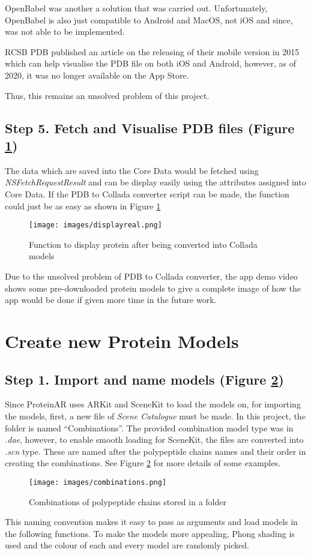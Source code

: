 OpenBabel was another a solution that was carried out. Unfortunately, OpenBabel is also just compatible to Android and MacOS, not iOS and since, was not able to be implemented. 

RCSB PDB published an article on the releasing of their mobile version in 2015 which can help visualise the PDB file on both iOS and Android, however, as of 2020, it was no longer available on the App Store.

Thus, this remains an unsolved problem of this project.

\subsection{Step 5. Fetch and Visualise PDB files (Figure \ref{fig:displayreal})}

The data which are saved into the Core Data would be fetched using \emph{NSFetchRequestResult} and can be display easily using the attributes assigned into Core Data. If the PDB to Collada converter script can be made, the function could just be as easy as shown in Figure \ref{fig:displayreal}
 \begin{figure}[!htp]
	\centering
	\texttt{[image: images/displayreal.png]}
	\caption{Function to display protein after being converted into Collada models}
	\label{fig:displayreal}
\end{figure}

Due to the unsolved problem of PDB to Collada converter, the app demo video shows some pre-downloaded protein models to give a complete image of how the app would be done if given more time in the future work.

\section{Create new Protein Models}
\subsection{Step 1. Import and name models (Figure \ref{fig:combinations})}
Since ProteinAR uses ARKit and SceneKit to load the models on, for importing the models, first, a new file of \emph{Scene Catalogue} must be made. In this project, the folder is named “Combinations”. The provided combination model type was in \emph{.dae}, however, to enable smooth loading for SceneKit, the files are converted into \emph{.scn} type. These are named after the polypeptide chains names and their order in creating the combinations. See Figure \ref{fig:combinations} for more details of some examples.
 \begin{figure}[!htp]
	\centering
	\texttt{[image: images/combinations.png]}
	\caption{Combinations of polypeptide chains stored in a folder}
	\label{fig:combinations}
\end{figure}
This naming convention makes it easy to pass as arguments and load models in the following functions. To make the models more appealing, Phong shading is used and the colour of each and every model are randomly picked. 

